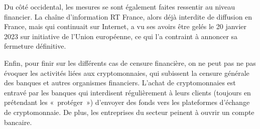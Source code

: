 Du côté occidental, les mesures se sont également faites ressentir au niveau financier. La chaîne d'information RT France, alors déjà interdite de diffusion en France, mais qui continuait sur Internet, a vu ses avoirs être gelés le 20 janvier 2023 sur initiative de l'Union européenne, ce qui l'a contraint à annoncer sa fermeture définitive.

Enfin, pour finir sur les différents cas de censure financière, on ne peut pas ne pas évoquer les activités liées aux cryptomonnaies, qui subissent la censure générale des banques et autres organismes financiers. L'achat de cryptomonnaies est entravé par les banques qui interdisent régulièrement à leurs clients (toujours en prétendant les «~protéger~») d'envoyer des fonds vers les plateformes d'échange de cryptomonnaie. De plus, les entreprises du secteur peinent à ouvrir un compte bancaire.


